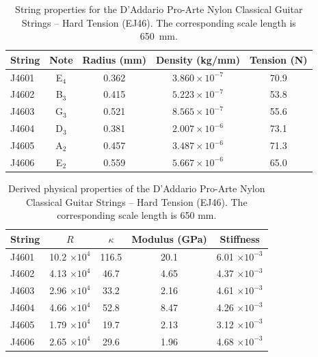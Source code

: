  \begin{table}[htbp]
  \centering
  \caption{\label{tbl:ej46_mks} String properties for the D'Addario Pro-Arte Nylon Classical Guitar Strings -- Hard Tension (EJ46). The corresponding scale length is 650~mm.}
    \begin{tabular}{lcccc}
    \hline \hline
    String  & Note  & \multicolumn{1}{l}{Radius (mm)} & \multicolumn{1}{l}{Density (kg/mm)} & \multicolumn{1}{l}{Tension (N)} \\
    \hline
    J4601 & E$_4$  & 0.362 & $3.860 \times 10^{-7}$ & 70.9 \\
    J4602 & B$_3$  & 0.415 & $5.223 \times 10^{-7}$ & 53.8 \\
    J4603 & G$_3$  & 0.521 & $8.565 \times 10^{-7}$ & 55.6 \\
    J4604 & D$_3$  & 0.381 & $2.007 \times 10^{-6}$ & 73.1 \\
    J4605 & A$_2$  & 0.457 & $3.487 \times 10^{-6}$ & 71.3 \\
    J4606 & E$_2$  & 0.559 & $5.667 \times 10^{-6}$ & 65.0 \\
    \hline
    \end{tabular}%
 \end{table}%

 \begin{table}[htbp]
  \centering
  \caption{\label{tbl:ej46_props} Derived physical properties of the D'Addario Pro-Arte Nylon Classical Guitar Strings -- Hard Tension (EJ46). The corresponding scale length is 650 mm.}
    \begin{tabular}{lcccc}
    \hline \hline
    String  & $R$ & $\kappa$ & Modulus (GPa) & Stiffness \\
    \hline
    J4601 & 10.2 $\times 10^{4}$ & 116.5 & 20.1 & 6.01 $\times 10^{-3}$ \\
    J4602 & 4.13 $\times 10^{4}$ & 46.7 & 4.65 & 4.37 $\times 10^{-3}$ \\
    J4603 & 2.96 $\times 10^{4}$ & 33.2 & 2.16 & 4.61 $\times 10^{-3}$ \\
    J4604 & 4.66 $\times 10^{4}$ & 52.8 & 8.47 & 4.26 $\times 10^{-3}$ \\
    J4605 & 1.79 $\times 10^{4}$ & 19.7 & 2.13 & 3.12 $\times 10^{-3}$ \\
    J4606 & 2.65 $\times 10^{4}$ & 29.6 & 1.96 & 4.68 $\times 10^{-3}$ \\
    \hline
    \end{tabular}%
 \end{table}%

